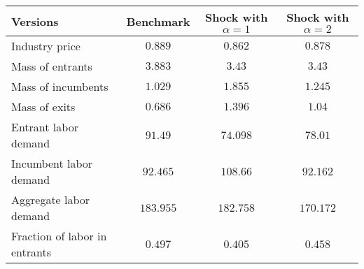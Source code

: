 \begin{tabular}{lccc}
\toprule
Versions & Benchmark & Shock with $\alpha = 1$ & Shock with $\alpha = 2$\\
\toprule
Industry price  & $0.889$ & $0.862$ & $0.878$\\
Mass of entrants & $3.883$ & $3.43$ & $3.43$\\
Mass of incumbents & $1.029$ & $1.855$ & $1.245$\\
Mass of exits & $0.686$ & $1.396$ & $1.04$\\
Entrant labor demand & $91.49$ & $74.098$ & $78.01$\\
Incumbent labor demand  & $92.465$ & $108.66$ & $92.162$\\
Aggregate labor demand  & $183.955$ & $182.758$ & $170.172$\\
Fraction of labor in entrants & $0.497$ & $0.405$ & $0.458$\\
\toprule
\end{tabular}
